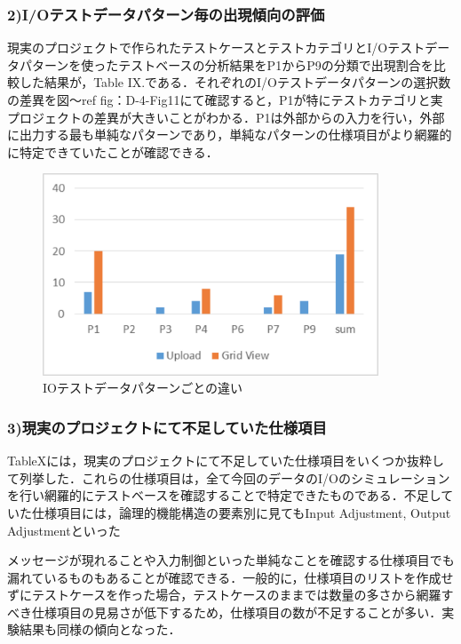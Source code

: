 \documentclass[a4paper,11pt]{jreport}
\begin{document}
\subsubsection{2)I/Oテストデータパターン毎の出現傾向の評価}

現実のプロジェクトで作られたテストケースとテストカテゴリとI/Oテストデータパターンを使ったテストベースの分析結果をP1からP9の分類で出現割合を比較した結果が，Table IX.である．それぞれのI/Oテストデータパターンの選択数の差異を図〜ref {fig：D-4-Fig11}にて確認すると，P1が特にテストカテゴリと実プロジェクトの差異が大きいことがわかる．P1は外部からの入力を行い，外部に出力する最も単純なパターンであり，単純なパターンの仕様項目がより網羅的に特定できていたことが確認できる．
   \begin{figure}[htbp]
  \begin{center}
  \includegraphics[width=10cm]{./image/D-4-Fig11.png}
  \caption{IOテストデータパターンごとの違い}
  \label{fig:D-4-Fig11}
  \end{center}
   \end{figure}


\subsubsection{3)現実のプロジェクトにて不足していた仕様項目}

TableXには，現実のプロジェクトにて不足していた仕様項目をいくつか抜粋して列挙した．これらの仕様項目は，全て今回のデータのI/Oのシミュレーションを行い網羅的にテストベースを確認することで特定できたものである．不足していた仕様項目には，論理的機能構造の要素別に見てもInput Adjustment, Output Adjustmentといった

メッセージが現れることや入力制御といった単純なことを確認する仕様項目でも漏れているものもあることが確認できる．一般的に，仕様項目のリストを作成せずにテストケースを作った場合，テストケースのままでは数量の多さから網羅すべき仕様項目の見易さが低下するため，仕様項目の数が不足することが多い．実験結果も同様の傾向となった．
\end{document}
